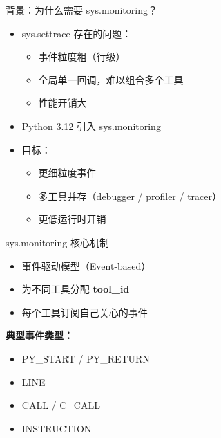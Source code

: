 \documentclass{beamer}
\begin{document}
\begin{frame}{背景：为什么需要 sys.monitoring？}
\begin{itemize}
  \item sys.settrace 存在的问题：
    \begin{itemize}
      \item 事件粒度粗（行级）
      \item 全局单一回调，难以组合多个工具
      \item 性能开销大
    \end{itemize}
  \item Python 3.12 引入 sys.monitoring
  \item 目标：
    \begin{itemize}
      \item 更细粒度事件
      \item 多工具并存（debugger / profiler / tracer）
      \item 更低运行时开销
    \end{itemize}
\end{itemize}
\end{frame}

\begin{frame}{sys.monitoring 核心机制}
\begin{itemize}
  \item 事件驱动模型（Event-based）
  \item 为不同工具分配 \textbf{tool\_id}
  \item 每个工具订阅自己关心的事件
\end{itemize}

\textbf{典型事件类型：}
\begin{itemize}
  \item PY\_START / PY\_RETURN
  \item LINE
  \item CALL / C\_CALL
  \item INSTRUCTION
\end{itemize}
\end{frame}
\end{document}
